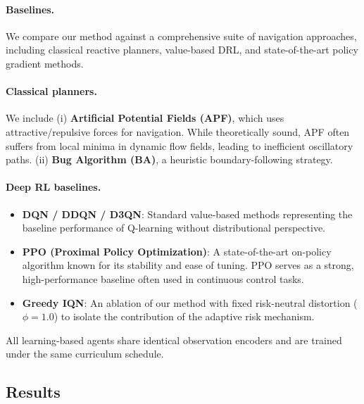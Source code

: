 \paragraph{Baselines.}
We compare our method against a comprehensive suite of navigation approaches, including classical reactive planners, value-based DRL, and state-of-the-art policy gradient methods.

\paragraph{Classical planners.}
We include (i) \textbf{Artificial Potential Fields (APF)}, which uses attractive/repulsive forces for navigation. While theoretically sound, APF often suffers from local minima in dynamic flow fields, leading to inefficient oscillatory paths.
(ii) \textbf{Bug Algorithm (BA)}, a heuristic boundary-following strategy.

\paragraph{Deep RL baselines.}
\begin{itemize}
    \item \textbf{DQN / DDQN / D3QN}: Standard value-based methods representing the baseline performance of Q-learning without distributional perspective.
    \item \textbf{PPO (Proximal Policy Optimization)}: A state-of-the-art on-policy algorithm known for its stability and ease of tuning. PPO serves as a strong, high-performance baseline often used in continuous control tasks.
    \item \textbf{Greedy IQN}: An ablation of our method with fixed risk-neutral distortion ($\phi=1.0$) to isolate the contribution of the adaptive risk mechanism.
\end{itemize}

All learning-based agents share identical observation encoders and are trained under the same curriculum schedule.

\subsection{Results}
\label{sec:results}

